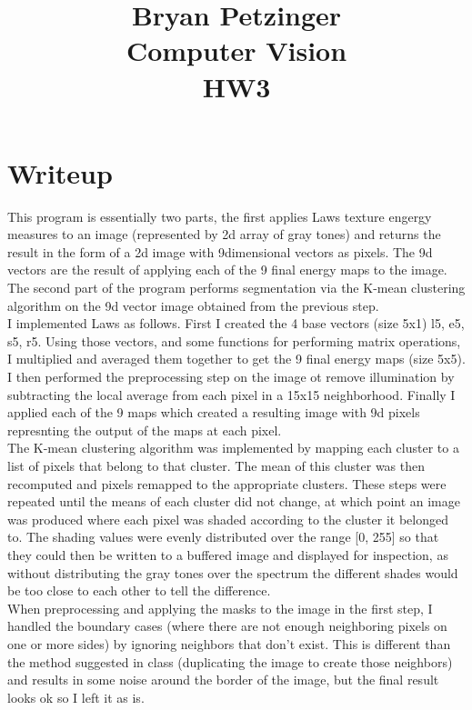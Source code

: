 \documentclass[12pt]{article}
\title{
Bryan Petzinger \\
Computer Vision \\
HW3 \\
}
\begin{document}
\section{Writeup}
This program is essentially two parts, the first applies Laws texture engergy measures to an image (represented by 2d array of gray tones) and returns the result in the form of a 2d image with 9dimensional vectors as pixels. The 9d vectors are the result of applying each of the 9 final energy maps to the image. The second part of the program performs segmentation via the K-mean clustering algorithm on the 9d vector image obtained from the previous step. \\

I implemented Laws as follows. First I created the 4 base vectors (size 5x1) l5, e5, s5, r5. Using those vectors, and some functions for performing matrix operations, I multiplied and averaged them together to get the 9 final energy maps (size 5x5). I then performed the preprocessing step on the image ot remove illumination by subtracting the local average from each pixel in a 15x15 neighborhood. Finally I applied each of the 9 maps which created a resulting image with 9d pixels represnting the output of the maps at each pixel. \\

The K-mean clustering algorithm was implemented by mapping each cluster to a list of pixels that belong to that cluster. The mean of this cluster was then recomputed and pixels remapped to the appropriate clusters. These steps were repeated until the means of each cluster did not change, at which point an image was produced where each pixel was shaded according to the cluster it belonged to. The shading values were evenly distributed over the range [0, 255] so that they could then be written to a buffered image and displayed for inspection, as without distributing the gray tones over the spectrum the different shades would be too close to each other to tell the difference. \\

When preprocessing and applying the masks to the image in the first step, I handled the boundary cases (where there are not enough neighboring pixels on one or more sides) by ignoring neighbors that don't exist. This is different than the method suggested in class (duplicating the image to create those neighbors) and results in some noise around the border of the image, but the final result looks ok so I left it as is. \\
\end{document}
